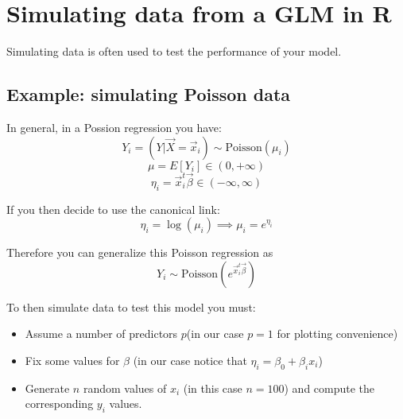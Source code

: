 \chapter{Simulating data from a GLM in R}
Simulating data is often used to test the performance of your model.

\section{Example: simulating Poisson data}
In general, in a Possion regression you have:
$$Y_i = (Y|\vec{X} = \vec{x}_i) \sim \text{Poisson}(\mu_i)$$
$$\mu = E[Y_i] \in (0, +\infty)$$
$$\eta_i = \vec{x}_i^t\vec{\beta} \in (-\infty, \infty)$$

If you then decide to use the canonical link:
$$\eta_i = \log(\mu_i) \implies \mu_i = e^{\eta_i}$$

Therefore you can generalize this Poisson regression as
$$Y_i \sim \text{Poisson}(e^{\vec{x}_i^t\vec{\beta}})$$

To then simulate data to test this model you must:
\begin{itemize}
  \item Assume a number of predictors $p$(in our case $p=1$ for plotting convenience)
  \item Fix some values for $\beta$ (in our case notice that $\eta_i = \beta_0 + \beta_ix_i$)
  \item Generate $n$ random values of $x_i$ (in this case $n=100$) and compute the corresponding $y_i$ values.
\end{itemize}

